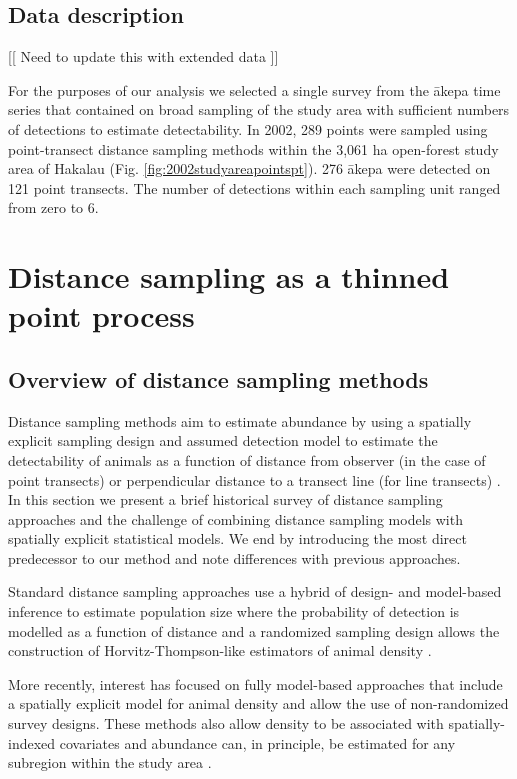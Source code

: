 \documentclass[preprint,12pt]{elsarticle}
\newcommand{\akepa}{\textquotesingle\={a}kepa}  %
\begin{document}
\subsection{Data description}
[[ Need to update this with extended data ]]

For the purposes of our analysis we selected a single survey from the \akepa{} time series that contained on broad sampling of the study area with sufficient numbers of detections to estimate detectability. In 2002, 289 points were sampled using point-transect distance sampling methods within the 3,061 ha open-forest study area of Hakalau (Fig. \ref{fig:2002studyareapointspt}). 276 \akepa{} were detected on 121 point transects. The number of detections within each sampling unit ranged from zero to 6. 


\section{Distance sampling as a thinned point process}

\subsection{Overview of distance sampling methods}

Distance sampling methods aim to estimate abundance by using a spatially explicit sampling design and assumed detection model to estimate the detectability of animals as a function of distance from observer (in the case of point transects) or perpendicular distance to a transect line (for line transects) \citep{buckland_advanced_2004, buckland_distance_2015}. In this section we present a brief historical survey of distance sampling approaches and the challenge of combining distance sampling models with spatially explicit statistical models.  We end by introducing the most direct predecessor to our method and note differences with previous approaches. 

Standard distance sampling approaches use a hybrid of design- and model-based inference to estimate population size where the probability of detection is modelled as a function of distance and a randomized sampling design allows the construction of Horvitz-Thompson-like estimators of animal density \citep{horvitz_generalization_1952,  buckland_advanced_2004}.

More recently, interest has focused on fully model-based approaches that include a spatially explicit model for animal density and allow the use of non-randomized survey designs.  These methods also allow density to be associated with spatially-indexed covariates and abundance can, in principle, be estimated for any subregion within the study area \citep{johnson_model-based_2010, miller_spatial_2013, buckland_model-based_2016}.  
\end{document}

